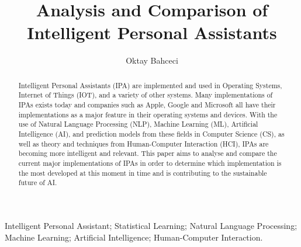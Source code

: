 \documentclass[preprint,12pt]{elsarticle}
\begin{document}
\begin{frontmatter}



\title{Analysis and Comparison of Intelligent Personal Assistants}


\author[a]{Oktay Bahceci}

\address[a]{oktayb@kth.se}

\newpage
\begin{abstract}
Intelligent Personal Assistants (IPA) are implemented and used in Operating Systems, Internet of Things (IOT), and a variety of other systems. Many implementations of IPAs exists today and companies such as Apple, Google and Microsoft all have their implementations as a major feature in their operating systems and devices.
With the use of Natural Language Processing (NLP), Machine Learning (ML), Artificial Intelligence (AI), and prediction models from these fields in Computer Science (CS), as well as theory and techniques from Human-Computer Interaction (HCI), IPAs are becoming more intelligent and relevant. This paper aims to analyse and compare the current major implementations of IPAs in order to determine which implementation is the most developed at this moment in time and is contributing to the sustainable future of AI.

\end{abstract}

\begin{keyword}
Intelligent Personal Assistant; Statistical Learning; Natural Language Processing; Machine Learning; Artificial Intelligence; Human-Computer Interaction.
\end{keyword}

\end{frontmatter}
\end{document}
